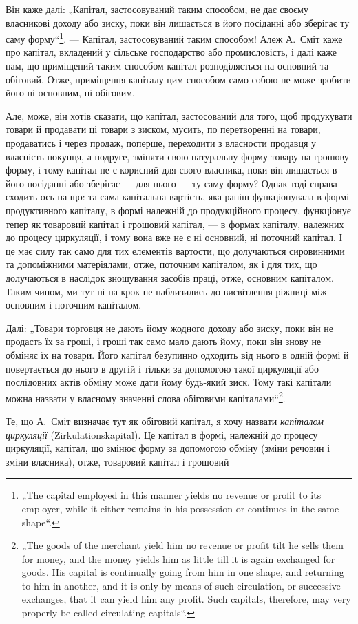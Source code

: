 
Він каже далі: „Капітал, застосовуваний таким способом, не дає своєму
власникові доходу або зиску, поки він лишається в його посіданні або
зберігає ту саму форму“\footnote*{
„The capital employed in this manner yields no revenue or profit to its employer,
while it either remains in his possession or continues in the same shape“.
}. — Капітал, застосовуваний таким способом!
Алеж А.~Сміт каже про капітал, вкладений у сільське господарство або
промисловість, і далі каже нам, що приміщений таким способом капітал
розподіляється на основний та обіговий. Отже, приміщення капіталу цим
способом само собою не може зробити його ні основним, ні обіговим.

Але, може, він хотів сказати, що капітал, застосований для того, щоб
продукувати товари й продавати ці товари з зиском, мусить, по перетворенні
на товари, продаватись і через продаж, поперше, переходити з
власности продавця у власність покупця, а подруге, зміняти свою натуральну
форму товару на грошову форму, і тому капітал не є корисний
для свого власника, поки він лишається в його посіданні або зберігає —
для нього — ту саму форму? Однак тоді справа сходить ось на що: та
сама капітальна вартість, яка раніш функціонувала в формі продуктивного
капіталу, в формі належній до продукційного процесу, функціонує
тепер як товаровий капітал і грошовий капітал, — в формах капіталу, належних
до процесу циркуляції, і тому вона вже не є ні основний, ні поточний
капітал. І це має силу так само для тих елементів вартости, що
долучаються сировинними та допоміжними матеріялами, отже, поточним
капіталом, як і для тих, що долучаються в наслідок зношування засобів
праці, отже, основним капіталом. Таким чином, ми тут ні на крок не
наблизились до висвітлення ріжниці між основним і поточним капіталом.

Далі: „Товари торговця не дають йому жодного доходу або зиску,
поки він не продасть їх за гроші, і гроші так само мало дають йому,
поки він знову не обміняє їх на товари. Його капітал безупинно одходить
від нього в одній формі й повертається до нього в другій і тільки
за допомогою такої циркуляції або послідовних актів обміну може дати
йому будь-який зиск. Тому такі капітали можна назвати у власному значенні
слова обіговими капіталами“\footnote*{
„The goods of the merchant yield him no revenue or profit tilt he sells them
for money, and the money yields him as little till it is again exchanged for goods.
His capital is continually going from him in one shape, and returning to him in
another, and it is only by means of such circulation, or successive exchanges, that
it can yield him any profit. Such capitals, therefore, may very properly be called
circulating capitals“.
}.

Те, що А.~Сміт визначає тут як обіговий капітал, я хочу назвати
\emph{капіталом циркуляції} (Zirkulationskapital). Це капітал в формі,
належній до процесу циркуляції, капітал, що змінює форму за допомогою
обміну (зміни речовин і зміни власника), отже, товаровий капітал і грошовий
\parbreak{}  %
